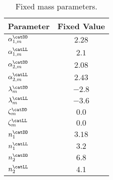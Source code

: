 \begin{table}[htb]
\caption{Fixed mass parameters.}
\label{tab:app:measurement_of_sin2beta:cpv_measurement:fixed_parameters:mass}
\centering
\begin{tabular}{lr@{$\,\pm\,$}l}
  \toprule
  Parameter                     & \multicolumn{2}{c}{Fixed Value} \\
  \midrule
  $\alpha_{1,m}^\text{\catDD}$      & \multicolumn{2}{c}{$2.28$}\\
  $\alpha_{1,m}^\text{\catLL}$      & \multicolumn{2}{c}{$2.1$}\\
  $\alpha_{2,m}^\text{\catDD}$      & \multicolumn{2}{c}{$2.08$}\\
  $\alpha_{2,m}^\text{\catLL}$      & \multicolumn{2}{c}{$2.43$}\\
  $\lambda_m^\text{\catDD}$         & \multicolumn{2}{c}{$-2.8$}\\
  $\lambda_m^\text{\catLL}$         & \multicolumn{2}{c}{$-3.6$}\\
  $\zeta_m^\text{\catDD}$           & \multicolumn{2}{c}{$0.0$}\\
  $\zeta_m^\text{\catLL}$           & \multicolumn{2}{c}{$0.0$}\\
  $n_1^\text{\catDD}$               & \multicolumn{2}{c}{$3.18$}\\
  $n_1^\text{\catLL}$               & \multicolumn{2}{c}{$3.2$}\\
  $n_2^\text{\catDD}$               & \multicolumn{2}{c}{$6.8$}\\
  $n_2^\text{\catLL}$               & \multicolumn{2}{c}{$4.1$}\\
  \bottomrule
\end{tabular}
\end{table}
%
